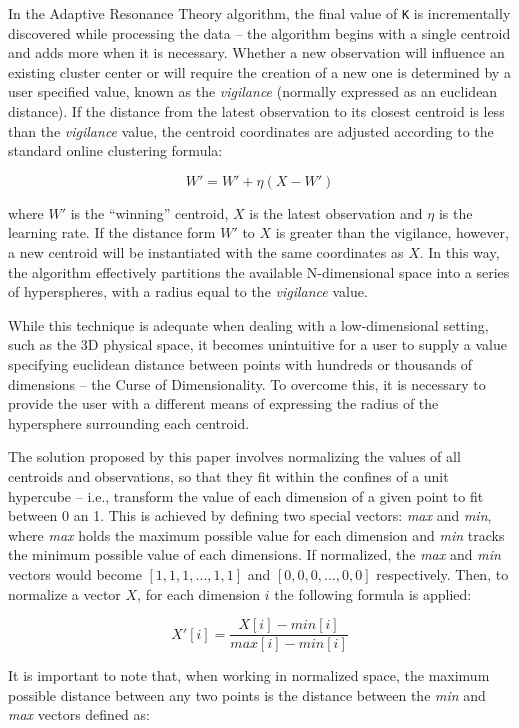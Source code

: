 \documentclass{l4proj}
\begin{document}
In the Adaptive Resonance Theory algorithm, the final value of \texttt{K} is incrementally discovered while processing the data -- the algorithm begins with a single centroid and adds more when it is necessary. Whether a new observation will influence an existing cluster center or will require the creation of a new one is determined by a user specified value, known as the \textit{vigilance} (normally expressed as an euclidean distance). If the distance from the latest observation to its closest centroid is less than the \textit{vigilance} value, the centroid coordinates are adjusted according to the standard online clustering formula:

$$W' = W' + \eta(X - W')$$

\noindent where $W'$ is the ``winning'' centroid, $X$ is the latest observation and $\eta$ is the learning rate. If the distance form $W'$ to $X$ is greater than the vigilance, however, a new centroid will be instantiated with the same coordinates as $X$. In this way, the algorithm effectively partitions the available N-dimensional space into a series of hyperspheres, with a radius equal to the \textit{vigilance} value.

While this technique is adequate when dealing with a low-dimensional setting, such as the 3D physical space, it becomes unintuitive for a user to supply a value specifying euclidean distance between points with hundreds or thousands of dimensions -- the Curse of Dimensionality\cite{CurseOfDimensionality}. To overcome this, it is necessary to provide the user with a different means of expressing the radius of the hypersphere surrounding each centroid.

The solution proposed by this paper involves normalizing the values of all centroids and observations, so that they fit within the confines of a unit hypercube -- i.e., transform the value of each dimension of a given point to fit between 0 an 1. This is achieved by defining two special vectors: \textit{max} and \textit{min}, where \textit{max} holds the maximum possible value for each dimension and \textit{min} tracks the minimum possible value of each dimensions. If normalized, the \textit{max} and \textit{min} vectors would become $[1, 1, 1, ..., 1, 1]$ and $[0, 0, 0, ..., 0, 0]$ respectively. Then, to normalize a vector $X$, for each dimension $i$ the following formula is applied:

$$X'[i] = \frac{X[i] - min[i]}{max[i] - min[i]}$$

It is important to note that, when working in normalized space, the maximum possible distance between any two points is the distance between the \textit{min} and \textit{max} vectors defined as:
\end{document}
